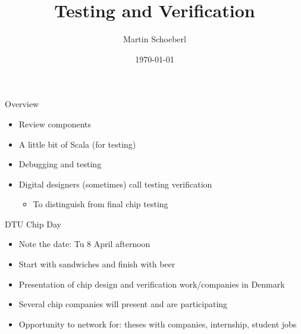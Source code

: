 

\newif\ifbook


\title{Testing and Verification}
\author{Martin Schoeberl}
\date{\today}



\begin{frame}
\titlepage
\end{frame}


\begin{frame}[fragile]{Overview}
\begin{itemize}
\item Review components
\item A little bit of Scala (for testing)
\item Debugging and testing
\item Digital designers (sometimes) call testing verification
\begin{itemize}
\item To distinguish from final chip testing
\end{itemize}
\end{itemize}
\end{frame}

\begin{frame}[fragile]{DTU Chip Day}
\begin{itemize}
\item Note the date: Tu 8 April afternoon
\item Start with sandwiches and finish with beer
\item Presentation of chip design and verification work/companies in Denmark
\item Several chip companies will present and are participating
\item Opportunity to network for: theses with companies, internship, student jobs
\end{itemize}
\end{frame}

